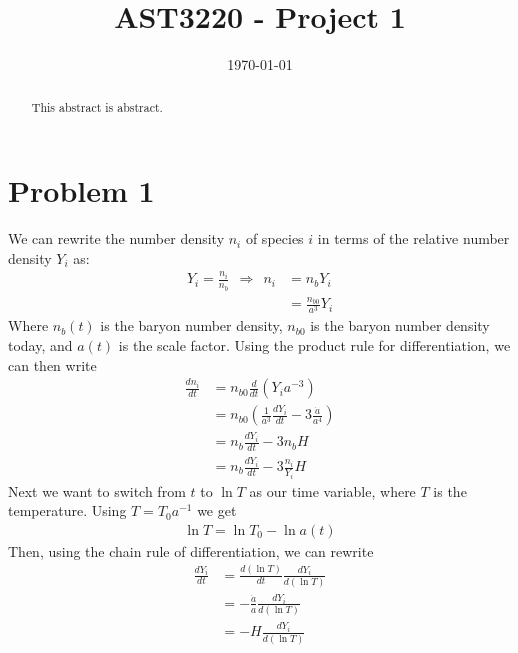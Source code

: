 \documentclass[reprint,english,notitlepage]{revtex4-1}  %
\numberwithin{equation}{section}
\begin{document}
\title{AST3220 - Project 1}   %
\date{\today}                             %
\noaffiliation                            %
\begin{abstract}                          %
This abstract is abstract.                %
\end{abstract}                            %
\maketitle                                %

\section{Problem 1}
 We can rewrite the number density $n_i$ of species $i$ in terms of the relative number
 density $Y_i$ as:
\begin{align}
	Y_i = \frac{n_i}{n_b} \ \ \Rightarrow \ \ n_i &= n_b Y_i \label{eq:rel_no_density} \\
																						&= \frac{n_{b0}}{a^3}Y_i
\end{align}
Where $n_b(t)$ is the baryon number density, $n_{b0}$ is the baryon number
density today, and $a(t)$ is the scale factor. Using the product rule for
differentiation, we can then write
\begin{align}
	\frac{d n_i}{dt} &= n_{b0}\frac{d}{dt}\left(Y_i a^{-3}\right) \\
									 &= n_{b0}\left(\frac{1}{a^3}\frac{dY_i}{dt} - 3\frac{\dot{a}}{a^4}\right) \\
									 &= n_b \frac{dY_i}{dt} - 3 n_b H \label{eq:no_density} \\
									 &= n_b \frac{dY_i}{dt} - 3 \frac{n_i}{Y_i} H \label{eq:no_density}
\end{align}
Next we want to switch from $t$ to $\ln T$ as our time variable, where
$T$ is the temperature. Using $T=T_0 a^{-1}$ we get
\begin{align}
	\ln T = \ln T_0 - \ln a(t)
\end{align}
Then, using the chain rule of differentiation, we can rewrite
\begin{align}
	\frac{dY_i}{dt} &= \frac{d(\ln T)}{dt} \frac{dY_i}{d(\ln T)} \\
									&= -\frac{\dot{a}}{a} \frac{dY_i}{d(\ln T)} \\
									&= -H \frac{dY_i}{d(\ln T)}
\end{align}
\end{document}
